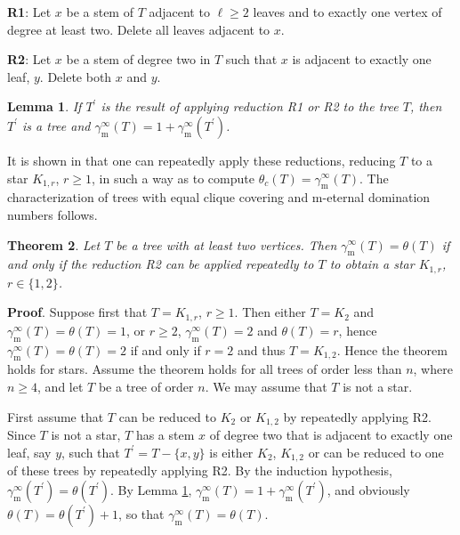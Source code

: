 \documentclass[12pt]{article}%
\newtheorem{theorem}{Theorem}[section]
\newtheorem{lemma}[theorem]{Lemma}
\begin{document}
\smallskip\noindent\textbf{R1}: Let $x$ be a stem of $T$ adjacent to $\ell
\geq2$ leaves and to exactly one vertex of degree at least two. Delete all
leaves adjacent to $x$.

\smallskip\noindent\textbf{R2}: Let $x$ be a stem of degree two in $T$ such
that $x$ is adjacent to exactly one leaf, $y$. Delete both $x$ and $y$.

\begin{lemma}
\emph{\cite{KM2}} \label{rlemma} If $T^{\prime}$ is the result of applying
reduction R1 or R2 to the tree $T$, then $T^{\prime}$ is a tree and
$\gamma_{\mathrm{m}}^{\infty}(T)=1+\gamma_{\mathrm{m}}^{\infty}(T^{\prime})$.
\end{lemma}

It is shown in \cite{KM2} that one can repeatedly apply these reductions,
reducing $T$ to a star $K_{1,r}$, $r\geq1$, in such a way as to compute
$\theta_{c}(T)=\gamma_{\mathrm{m}}^{\infty}(T)$. The characterization of trees
with equal clique covering and $\mathrm{m}$-eternal domination numbers follows.

\begin{theorem}
\label{ThmTheta}Let $T$ be a tree with at least two vertices. Then
$\gamma_{\mathrm{m}}^{\infty}(T)=\theta(T)$ if and only if the reduction R2
can be applied repeatedly to $T$ to obtain a star $K_{1,r}$, $r\in\{1,2\}$.
\end{theorem}

\noindent\textbf{Proof}.\hspace{0.1in} Suppose first that $T=K_{1,r}$,
$r\geq1$. Then either $T=K_{2}$ and $\gamma_{\mathrm{m}}^{\infty}%
(T)=\theta(T)=1$, or $r\geq2$, $\gamma_{\mathrm{m}}^{\infty}(T)=2$ and
$\theta(T)=r$, hence $\gamma_{\mathrm{m}}^{\infty}(T)=\theta(T)=2$ if and only
if $r=2$ and thus $T=K_{1,2}$. Hence the theorem holds for stars. Assume the
theorem holds for all trees of order less than $n$, where $n\geq4$, and let
$T$ be a tree of order $n$. We may assume that $T$ is not a star.

First assume that $T$ can be reduced to $K_{2}$ or $K_{1,2}$ by repeatedly
applying R2. Since $T$ is not a star, $T$ has a stem $x$ of degree two that is
adjacent to exactly one leaf, say $y$, such that $T^{\prime}=T-\{x,y\}$ is
either $K_{2}$, $K_{1,2}$ or can be reduced to one of these trees by
repeatedly applying R2. By the induction hypothesis, $\gamma_{\mathrm{m}%
}^{\infty}(T^{\prime})=\theta(T^{\prime})$. By Lemma \ref{rlemma},
$\gamma_{\mathrm{m}}^{\infty}(T)=1+\gamma_{\mathrm{m}}^{\infty}(T^{\prime})$,
and obviously $\theta(T)=\theta(T^{\prime})+1$, so that $\gamma_{\mathrm{m}%
}^{\infty}(T)=\theta(T)$.
\end{document}
